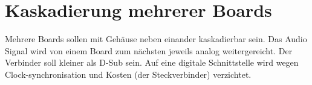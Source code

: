 \section{Kaskadierung mehrerer Boards}
\label{sec:Konzept_Kaskadierung}

Mehrere Boards sollen mit Gehäuse neben einander kaskadierbar sein. Das Audio Signal wird von einem Board zum nächsten jeweils analog weitergereicht. Der Verbinder soll kleiner als D-Sub sein. Auf eine digitale Schnittstelle wird wegen Clock-synchronisation und Kosten (der Steckverbinder) verzichtet.


